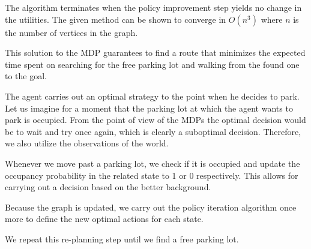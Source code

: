 The algorithm terminates when the policy improvement step yields no change in
the utilities. The given method can be shown to converge in $O(n^3)$ where $n$
is the number of vertices in the graph.

This solution to the MDP guarantees to find a route that minimizes the
expected time spent on searching for the free parking lot and walking from the
found one to the goal.


The agent carries out an optimal strategy to the point when he decides to
park. Let us imagine for a moment that the parking lot at which the agent
wants to park is occupied. From the point of view of the MDPs the optimal
decision would be to wait and try once again, which is clearly a suboptimal
decision. Therefore, we also utilize the observations of the world.

Whenever we move past a parking lot, we check if it is occupied and update
the occupancy probability in the related state to 1 or 0 respectively.
This allows for carrying out a decision based on the better background.

Because the graph is updated, we carry out the policy iteration algorithm
once more to define the new optimal actions for each state.

We repeat this re-planning step until we find a free parking lot.


